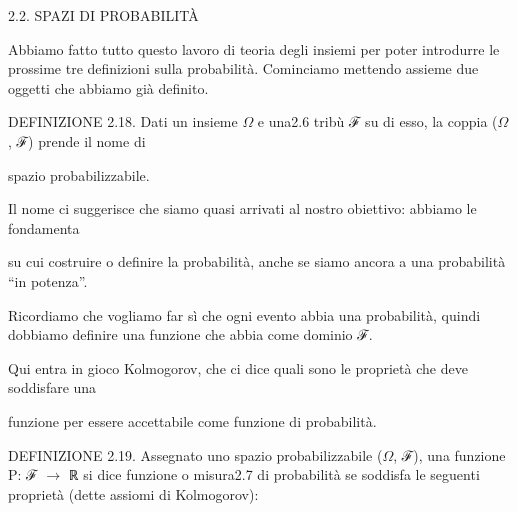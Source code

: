 \documentclass[a4paper,portrait,12pt]{article}
\begin{document}
\begin{flushleft}
2.2. SPAZI DI PROBABILIT\`{A}
\end{flushleft}


\begin{flushleft}
Abbiamo fatto tutto questo lavoro di teoria degli insiemi per poter introdurre le prossime tre definizioni sulla probabilit\`{a}. Cominciamo mettendo assieme due oggetti che abbiamo gi\`{a} definito.
\end{flushleft}


\begin{flushleft}
DEFINIZIONE 2.18. Dati un insieme $\Omega$ e una2.6 tribù ℱ su di esso, la coppia ($\Omega$, ℱ) prende il nome di
\end{flushleft}


\begin{flushleft}
spazio probabilizzabile.
\end{flushleft}


\begin{flushleft}
Il nome ci suggerisce che siamo quasi arrivati al nostro obiettivo: abbiamo le fondamenta
\end{flushleft}


\begin{flushleft}
su cui costruire o definire la probabilit\`{a}, anche se siamo ancora a una probabilit\`{a} {``}in potenza''.
\end{flushleft}


\begin{flushleft}
Ricordiamo che vogliamo far sì che ogni evento abbia una probabilit\`{a}, quindi dobbiamo definire una funzione che abbia come dominio ℱ.
\end{flushleft}


\begin{flushleft}
Qui entra in gioco Kolmogorov, che ci dice quali sono le propriet\`{a} che deve soddisfare una
\end{flushleft}


\begin{flushleft}
funzione per essere accettabile come funzione di probabilit\`{a}.
\end{flushleft}


\begin{flushleft}
DEFINIZIONE 2.19. Assegnato uno spazio probabilizzabile ($\Omega$, ℱ), una funzione P: ℱ $\rightarrow$ ℝ si dice funzione o misura2.7 di probabilit\`{a} se soddisfa le seguenti propriet\`{a} (dette assiomi di Kolmogorov):
\end{flushleft}
\end{document}
